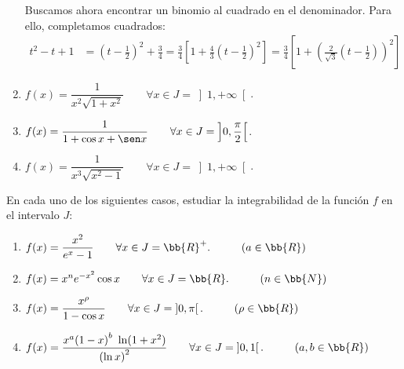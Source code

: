 \begin{ejercicio}
\begin{enumerate}
        Buscamos ahora encontrar un binomio al cuadrado en el denominador. Para ello, completamos cuadrados:
        \begin{align*}
            t^2-t+1&=\left(t-\frac{1}{2}\right)^2+\frac{3}{4}
            = \frac{3}{4}\left[1+\frac{4}{3}\left(t-\frac{1}{2}\right)^2\right]
            = \frac{3}{4}\left[1+\left(\frac{2}{\sqrt{3}}\left(t-\frac{1}{2}\right)\right)^2\right]
        \end{align*}



        \item $f(x)=\dfrac{1}{x^2\sqrt{1+x^2}} \qquad \forall x\in J=\left]1,+\infty\right[$.  
        \item $f(x)=\dfrac{1}{1+\cos x + \sen x} \qquad \forall x\in J=\left]0,\dfrac{\pi}{2}\right[$.
        \item $f(x)=\dfrac{1}{x^3\sqrt{x^2-1}} \qquad \forall x\in J=\left]1,+\infty\right[$.
    \end{enumerate}
\end{ejercicio}

\begin{ejercicio}
    En cada uno de los siguientes casos, estudiar la integrabilidad de la función $f$ en el intervalo $J$:
    \begin{enumerate}
        \item $f(x)=\dfrac{x^2}{e^x-1}\qquad \forall x\in J=\bb{R}^+.\hspace{1cm}(a\in \bb{R})$
        \item $f(x)=x^n e^{-x^2}\cos x \qquad \forall x\in J=\bb{R}.\hspace{1cm}(n\in \bb{N})$
        \item $f(x)=\dfrac{x^\rho}{1-\cos x} \qquad \forall x\in J=\left]0,\pi\right[.\hspace{1cm}(\rho\in \bb{R})$
        \item $f(x)=\dfrac{x^a{(1-x)}^b~\ln(1+x^2)}{{(\ln x)}^2} \qquad \forall x\in J=\left]0,1\right[.\hspace{1cm}(a,b\in \bb{R})$
    \end{enumerate}
\end{ejercicio}
